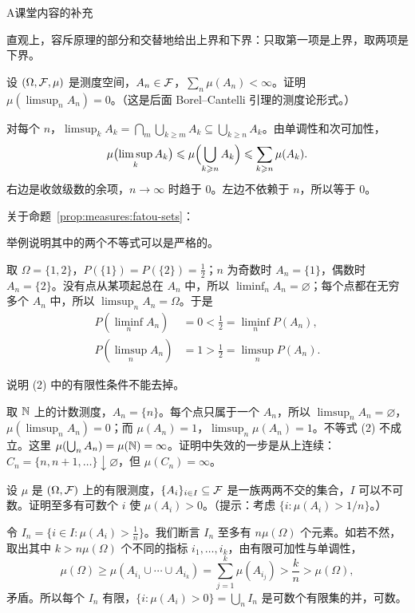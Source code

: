 \begin{exercises}{A}{课堂内容的补充}
\begin{questions}
\begin{solution}
直观上，容斥原理的部分和交替地给出上界和下界：只取第一项是上界，取两项是下界。
\end{solution}
\end{questions}

\item\label{ex:measures:A3} 设 $(\Omega,\mathcal{F},\mu)$ 是测度空间，$A_n\in\mathcal{F}$，$\sum_n\mu(A_n)<\infty$。证明 $\mu(\limsup_nA_n)=0$。（这是后面 Borel–Cantelli 引理的测度论形式。）
\begin{solution}
对每个 $n$，$\limsup_kA_k=\bigcap_m\bigcup_{k\geqslant m}A_k\subseteq\bigcup_{k\geqslant n}A_k$。由单调性和次可加性，
\[
\mu\bigl(\limsup_kA_k\bigr)\leqslant\mu\Bigl(\bigcup_{k\geqslant n}A_k\Bigr)\leqslant\sum_{k\geqslant n}\mu(A_k).
\]
右边是收敛级数的余项，$n\to\infty$ 时趋于 $0$。左边不依赖于 $n$，所以等于 $0$。
\end{solution}

\item\label{ex:measures:A4} 关于命题~\ref{prop:measures:fatou-sets}：
\begin{questions}
\item 举例说明其中的两个不等式可以是严格的。
\begin{solution}
取 $\Omega=\{1,2\}$，$P(\{1\})=P(\{2\})=\frac12$；$n$ 为奇数时 $A_n=\{1\}$，偶数时 $A_n=\{2\}$。没有点从某项起总在 $A_n$ 中，所以 $\liminf_nA_n=\varnothing$；每个点都在无穷多个 $A_n$ 中，所以 $\limsup_nA_n=\Omega$。于是
\[
\begin{aligned}
P(\liminf_nA_n)&=0<\tfrac12=\liminf_nP(A_n),\\
P(\limsup_nA_n)&=1>\tfrac12=\limsup_nP(A_n).
\end{aligned}
\]
\end{solution}
\item 说明 (2) 中的有限性条件不能去掉。
\begin{solution}
取 $\mathbb{N}$ 上的计数测度，$A_n=\{n\}$。每个点只属于一个 $A_n$，所以 $\limsup_nA_n=\varnothing$，$\mu(\limsup_nA_n)=0$；而 $\mu(A_n)=1$，$\limsup_n\mu(A_n)=1$。不等式 (2) 不成立。这里 $\mu(\bigcup_nA_n)=\mu(\mathbb{N})=\infty$。证明中失效的一步是从上连续：$C_n=\{n,n+1,\dots\}\downarrow\varnothing$，但 $\mu(C_n)=\infty$。
\end{solution}
\end{questions}

\item\label{ex:measures:A5} 设 $\mu$ 是 $(\Omega,\mathcal{F})$ 上的有限测度，$\{A_i\}_{i\in I}\subseteq\mathcal{F}$ 是一族两两不交的集合，$I$ 可以不可数。证明至多有可数个 $i$ 使 $\mu(A_i)>0$。（提示：考虑 $\{i:\mu(A_i)>1/n\}$。）
\begin{solution}
令 $I_n=\{i\in I:\mu(A_i)>\frac1n\}$。我们断言 $I_n$ 至多有 $n\mu(\Omega)$ 个元素。如若不然，取出其中 $k>n\mu(\Omega)$ 个不同的指标 $i_1,\dots,i_k$，由有限可加性与单调性，
\[
\mu(\Omega)\geqslant\mu(A_{i_1}\cup\cdots\cup A_{i_k})=\sum_{j=1}^k\mu(A_{i_j})>\frac kn>\mu(\Omega),
\]
矛盾。所以每个 $I_n$ 有限，$\{i:\mu(A_i)>0\}=\bigcup_nI_n$ 是可数个有限集的并，可数。


\end{solution}
\end{exercises}
